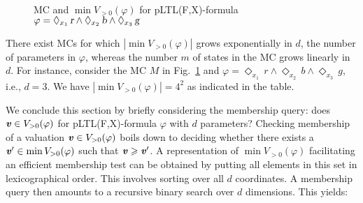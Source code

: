 \documentclass{llncs}
\renewcommand{\geq}{\geqslant}
\renewcommand{\a}[1]{\textbf{\textit{#1}}}
\newcommand{\ve}{{{\a v}}}
\newcommand{\de}{\Diamond}
\begin{document}
\begin{figure}
{}
\vspace{-0.5cm}\\
\caption{MC and $\min V_{> 0}(\varphi)$ for pLTL(F,X)-formula $\varphi = \de_{x_1} \, \mbox{\sl r} \wedge \de_{x_2} \, \mbox{\sl b} \wedge \de_{x_3} \, \mbox{\sl g}$}

\label{maxfig}
 \end{figure} 
\begin{example}\label{maxex}
There exist MCs for which $| \min V_{>0}(\varphi) |$ grows exponentially in $d$, the number of parameters in $\varphi$, whereas the number $m$ of states in the MC grows linearly in $d$.
For instance, consider the MC $M$ in Fig.~\ref{maxfig} and $\varphi = \de_{x_1} \, r \wedge \de_{x_2} \, b \wedge \de_{x_3} \, g$, i.e., $d{=}3$.
We have $| \min V_{>0}(\varphi) | = 4^2$ as indicated in the table.
\end{example}
 

\noindent 
We conclude this section by briefly considering the membership query: does ${ {\a v}} \in V_{> 0}(\varphi)$ for pLTL(F,X)-formula 
$\varphi$ with $d$ parameters?
Checking membership of a valuation $\ve\in V_{>0}(\varphi)$ boils down to deciding whether there exists a $\ve'\in \min V_{>0}(\varphi)$ such that $\ve \geq \ve'$.
A representation of $\min V_{> 0}(\varphi)$ facilitating an efficient membership test can be obtained by putting all elements in this set in lexicographical order.
This involves sorting over all $d$ coordinates.
A membership query then amounts to a recursive binary search over $d$ dimensions.
This yields:
\end{document}
